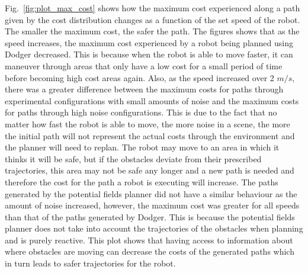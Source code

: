 \documentclass[letterpaper, 10pt, conference]{ieeeconf}
\begin{document}
Fig.~\ref{fig:plot_max_cost} shows how the maximum cost experienced along a
path given by the cost distribution changes as a function of the set speed of
the robot. The smaller the maximum cost, the safer the path. The figures shows
that as the speed increases, the maximum cost experienced by a robot being
planned using Dodger decreased. This is because when the robot is able to move
faster, it can maneuver through areas that only have a low cost for a small
period of time before becoming high cost areas again. Also, as the speed
increased over 2 $m/s$, there was a greater difference between the maximum
costs for paths through experimental configurations with small amounts of noise
and the maximum costs for paths through high noise configurations.  This is due
to the fact that no matter how fast the robot is able to move, the more noise
in a scene, the more the initial path will not represent the actual costs
through the environment and the planner will need to replan. The robot may move
to an area in which it thinks it will be safe, but if the obstacles deviate
from their prescribed trajectories, this area may not be safe any longer and a
new path is needed and therefore the cost for the path a robot is executing
will increase.  The paths generated by the potential fields planner did not
have a similar behaviour as the amount of noise increased, however, the maximum
cost was greater for all speeds than that of the paths generated by Dodger.
This is because the potential fields planner does not take into account the
trajectories of the obstacles when planning and is purely reactive. This plot
shows that having access to information about where obstacles are moving can
decrease the costs of the generated paths which in turn leads to safer
trajectories for the robot.
\end{document}
